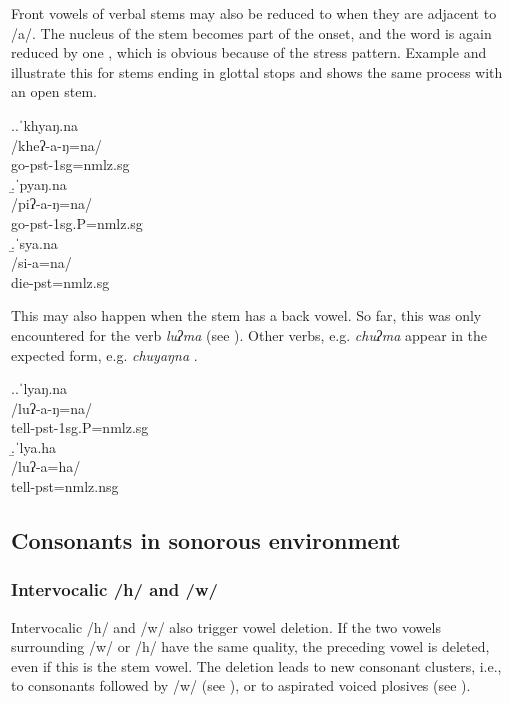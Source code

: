 Front vowels of verbal stems may also be reduced to  when they are adjacent to /a/. The  nucleus of the stem becomes part of the onset, and the word is again reduced by one , which is obvious because of the stress pattern. Example \Next[a] and \Next[b] illustrate this for stems  ending in glottal stops and \Next[c] shows the same process with an open stem.


\ex.\a.\glll ˈkhyaŋ.na\\
/kheʔ-a-ŋ=na/\\
go{\sc -pst-1sg=nmlz.sg}\\
\b.\glll ˈpyaŋ.na\\
/piʔ-a-ŋ=na/\\
go{\sc [3sg.A]-pst-1sg.P=nmlz.sg}\\
\b.\glll  ˈsya.na\\
/si-a=na/\\
die{\sc [3sg]-pst=nmlz.sg}\\

This may also happen when the stem has a back vowel. So far, this was only encountered for the verb \emph{luʔma} (see \Next). Other verbs, e.g. \emph{chuʔma}  appear in the expected form, e.g.  \emph{chuyaŋna} .

\ex.\a.\glll ˈlyaŋ.na\\
/luʔ-a-ŋ=na/\\
tell{\sc [3sg.A]-pst-1sg.P=nmlz.sg}\\
\b.\glll ˈlya.ha\\
/luʔ-a=ha/\\
tell{\sc [3sg.A;1.P]-pst=nmlz.nsg}\\


\subsection{Consonants in sonorous environment}\label{h-w-m}

\subsubsection{Intervocalic /h/ and /w/}
	
Intervocalic /h/ and /w/ also trigger vowel deletion. If the two vowels surrounding /w/ or /h/ have the same quality, the preceding vowel is deleted, even if this is the stem vowel. The deletion leads to new consonant clusters, i.e., to consonants followed by /w/ (see \Next[a]), or to aspirated voiced plosives (see \Next[b]). 

